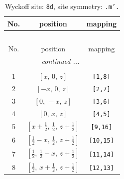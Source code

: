 \documentclass[fleqn,8pt]{jsarticle}
\begin{document}
\begin{longtable}{ccc}
\caption{Wyckoff site: {\tt 8d}, site symmetry: {\tt .m'.}}
 \\
 \hline \hline
No. & position & mapping \\ \hline \endfirsthead

\multicolumn{2}{l}{\tablename\ \thetable{}} \\
 \hline \hline
No. & position & mapping \\ \hline \endhead

 \hline \hline
\multicolumn{2}{r}{\footnotesize\it continued ...} \\ \endfoot

 \hline \hline
\multicolumn{2}{r}{} \\ \endlastfoot

1 & $\left[ x,\, 0,\, z \right]$ & {\tt [1,8]} \\ \hline
2 & $\left[ - x,\, 0,\, z \right]$ & {\tt [2,7]} \\ \hline
3 & $\left[ 0,\, - x,\, z \right]$ & {\tt [3,6]} \\ \hline
4 & $\left[ 0,\, x,\, z \right]$ & {\tt [4,5]} \\ \hline
5 & $\left[ x + \frac{1}{2},\, \frac{1}{2},\, z + \frac{1}{2} \right]$ & {\tt [9,16]} \\ \hline
6 & $\left[ \frac{1}{2} - x,\, \frac{1}{2},\, z + \frac{1}{2} \right]$ & {\tt [10,15]} \\ \hline
7 & $\left[ \frac{1}{2},\, \frac{1}{2} - x,\, z + \frac{1}{2} \right]$ & {\tt [11,14]} \\ \hline
8 & $\left[ \frac{1}{2},\, x + \frac{1}{2},\, z + \frac{1}{2} \right]$ & {\tt [12,13]} \\
\end{longtable}
\renewcommand{\arraystretch}{1.2}
\end{document}
